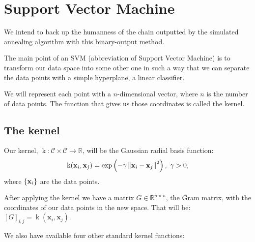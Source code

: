 \section{Support Vector Machine}

We intend to back up the humanness of the chain outputted by the simulated annealing algorithm with this binary-output method.

The main point of an SVM (abbreviation of Support Vector Machine) is to transform our data space into some other one in such a way that we can separate the data points with a simple hyperplane, a linear classifier.

We will represent each point with a $n$-dimensional vector, where $n$ is the number of data points. The function that gives us those coordinates is called the kernel.

\subsection{The kernel}

Our kernel, $\operatorname k:\mathcal C\times\mathcal C\to \mathbb R$, will be the Gaussian radial basis function: $$\operatorname k(\textbf x_i, \textbf x_j)=\exp \left( 
    -\gamma \left\| \textbf x_i -\textbf x_j \right\|^2 
\right),\ \gamma>0,$$ where $\{\textbf x_i\}$ are the data points.

After applying the kernel we have a matrix $G\in\mathbb R^{n\times n}$, the Gram matrix, with the coordinates of our data points in the new space. That will be: $[G]_{i,j}=\operatorname k(\textbf{x}_i,\textbf{x}_j)$.

We also have available four other standard kernel functions:\futnotetext{}

